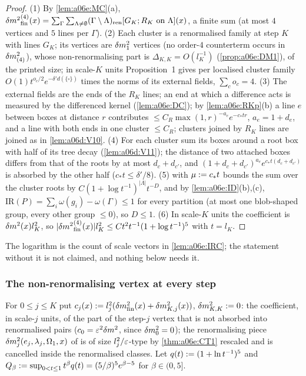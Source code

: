 \begin{proof}
(1) By \cref{lem:a06e:MC}(a), ${\delta m^2}^{(4)}_{\mathrm{fin}}(x)=\sum_\Gamma\sum_{\Lambda\ne\emptyset}(\Gamma\setminus\Lambda)_{\mathrm{ren}}[G_K;R_K\text{ on }\Lambda](x)$, a finite sum (at most $4$ vertices and $5$ lines per $\Gamma$). (2) Each cluster is a renormalised family at step $K$ with lines $G_K$; its \cite[(1.7)]{Ba3} vertices are $\delta m^2_1$ vertices (no order-$4$ counterterm occurs in $\delta m^2_{(4)}$), whose non-renormalising part is $\Delta_{K,K}=O(l_K^{-1})$ (\cref{prop:a06e:DM1}), of the printed size; in scale-$K$ units Proposition~1 gives per localised cluster family $O(1)t^{o_c/2}e^{-\delta'd(\{\square\})}$ times the norms of its external fields, $\sum_co_c=4$. (3) The external fields are the ends of the $R_K$ lines; an end at which a \cite[(1.8)]{Ba3} difference acts is measured by the differenced kernel (\cref{lem:a06e:DC}); by \cref{lem:a06e:RKp}(b) a line $e$ between boxes at distance $r$ contributes $\le C_R\max(1,r)^{-a_e}e^{-c_*tr}$, $a_e=1+d_e$, and a line with both ends in one cluster $\le C_R$; clusters joined by $R_K$ lines are joined as in \cref{lem:a06d:V10}. (4) For each cluster sum its boxes around a root box with half of its tree decay (\cref{lem:a06d:V11}); the distance of two attached boxes differs from that of the roots by at most $d_c+d_{c'}$, and $(1+d_c+d_{c'})^{a_e}e^{c_*t(d_c+d_{c'})}$ is absorbed by the other half ($c_*t\le\delta'/8$). (5)  with $\mu:= c_*t$ bounds the sum over the cluster roots by $C(1+\log t^{-1})^{|\Lambda|}t^{-D}$, and by \cref{lem:a06e:ID}(b),(c), $\mathrm{IR}(P)=\sum_i\omega(g_i)-\omega(\Gamma)\le1$ for every partition (at most one blob-shaped group, every other group $\le0$), so $D\le1$. (6) In scale-$K$ units the coefficient is $\delta m^2(x)l_K^2$, so $|{\delta m^2}^{(4)}_{\mathrm{fin}}(x)|l_K^2\le Ct^2t^{-1}(1+\log t^{-1})^5$ with $t=l_K$.
\end{proof}

The logarithm is the count of scale vectors in \cref{lem:a06e:IRC}; the statement without it is not claimed, and nothing below needs it.

\subsubsection*{The non-renormalising vertex at every step}

For $0\le j\le K$ put $c_j(x):= l_j^2(\delta m^2_{\mathrm{fin}}(x)+\delta m^2_{K,j}(x))$, $\delta m^2_{K,K}:=0$: the coefficient, in scale-$j$ units, of the part of the step-$j$ vertex \cite[(1.7), (1.29)]{Ba3} that is not absorbed into renormalised pairs ($c_0=\varepsilon^2\delta m^2$, since $\delta m^2_0=0$); the renormalising piece $\delta m^2_j(e_j,\lambda_j,\Omega_1,x)$ of \cite[(1.29)]{Ba3} is of size $l_j^2/\varepsilon$-type by \cref{thm:a06e:CT1} rescaled and is cancelled inside the renormalised classes. Let $q(t):=(1+\ln t^{-1})^5$ and $Q_\beta:=\sup_{0<t\le1}t^\beta q(t)=(5/\beta)^5e^{\beta-5}$ for $\beta\in(0,5]$.

